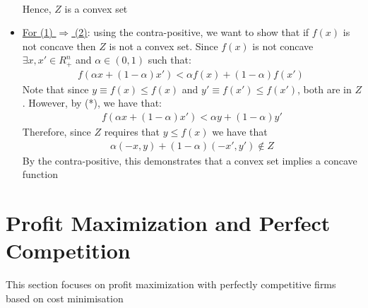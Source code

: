 \documentclass{article}
\begin{document}
\begin{itemize}
\begin{gather*}
    \end{gather*}
    Hence, $Z$ is a convex set
    \item  \underline{For (1) $\Rightarrow$ (2)}: using the contra-positive, we want to show that if $f(x)$ is not concave then $Z$ is not a convex set. Since $f(x)$ is not concave $\exists x, x' \in R_{+}^{n}$ and $\alpha \in (0,1)$ such that:
    \begin{gather*}
      f(\alpha x + (1- \alpha)x') < \alpha f(x) + (1-\alpha)f(x') \ \tag{*}
    \end{gather*}
    Note that since $y \equiv f(x) \leq f(x)$ and $y' \equiv f(x') \leq f(x')$, both are in $Z$. However, by (*), we have that:
    \begin{gather*}
      f(\alpha x + (1-\alpha)x') < \alpha y + (1-\alpha)y'
    \end{gather*}
    Therefore, since $Z$ requires that $y \leq f(x)$ we have that
    \begin{gather*}
      \alpha(-x,y) + (1-\alpha)(-x',y') \notin Z
    \end{gather*}
    By the contra-positive, this demonstrates that a convex set implies a concave function
  \end{itemize}

\newpage

\vspace{2.5mm}
\section{Profit Maximization and Perfect Competition}
This section focuses on profit maximization with perfectly competitive firms based on cost minimisation
\vspace{6mm}
\end{document}
